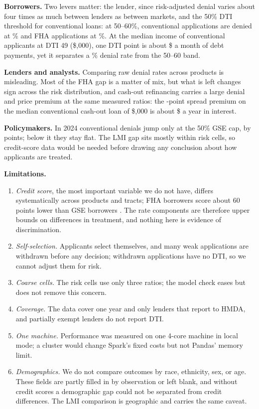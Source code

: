 \documentclass[acmtog,nonacm]{acmart}
\begin{document}
\textbf{Borrowers.} Two levers matter: the lender, since risk-adjusted denial varies about four times as much between lenders as between markets, and the 50\% DTI threshold for conventional loans: at 50--60\%, conventional applications are denied at \drConvFiftySixty\% and FHA applications at \drFHAFiftySixty\%. At the median income of conventional applicants at DTI 49 (\$\incDTIfortynine{},000), one DTI point is about \$\dtiPointMonthly{} a month of debt payments, yet it separates a \drConvFortynine\% denial rate from the 50--60 band.

\textbf{Lenders and analysts.} Comparing raw denial rates across products is misleading. Most of the FHA gap is a matter of mix, but what is left changes sign across the risk distribution, and cash-out refinancing carries a large denial and price premium at the same measured ratios: the \psCOconvGap-point spread premium on the median conventional cash-out loan of \$\loanCOconv{},000 is about \$\dollarCOconv{} a year in interest.

\textbf{Policymakers.} In 2024 conventional denials jump only at the 50\% GSE cap, by \jumpConvMain{} points; below it they stay flat. The LMI gap sits mostly within risk cells, so credit-score data would be needed before drawing any conclusion about how applicants are treated.

\textbf{Limitations.}
\begin{enumerate}[label=(\roman*),leftmargin=1.8em,itemsep=0pt,topsep=2pt,parsep=0pt]
\item \emph{Credit score}, the most important variable we do not have, differs systematically across products and tracts; FHA borrowers score about 60 points lower than GSE borrowers \citep{urban2026}. The rate components are therefore upper bounds on differences in treatment, and nothing here is evidence of discrimination.
\item \emph{Self-selection.} Applicants select themselves, and many weak applications are withdrawn before any decision; withdrawn applications have no DTI, so we cannot adjust them for risk.
\item \emph{Coarse cells.} The risk cells use only three ratios; the model check eases but does not remove this concern.
\item \emph{Coverage.} The data cover one year and only lenders that report to HMDA, and partially exempt lenders do not report DTI.
\item \emph{One machine.} Performance was measured on one 4-core machine in local mode; a cluster would change Spark's fixed costs but not Pandas' memory limit.
\item \emph{Demographics.} We do not compare outcomes by race, ethnicity, sex, or age. These fields are partly filled in by observation or left blank, and without credit scores a demographic gap could not be separated from credit differences. The LMI comparison is geographic and carries the same caveat.
\end{enumerate}
\end{document}
